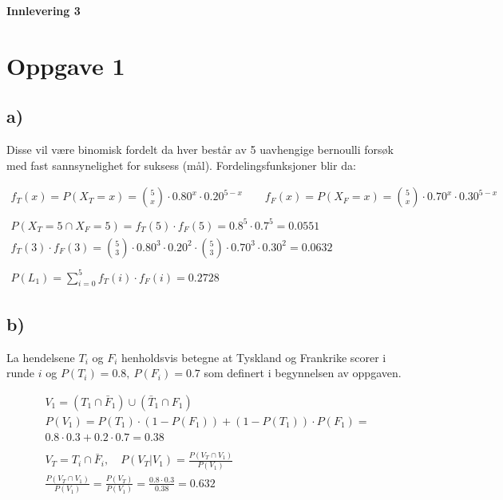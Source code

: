\begin{center}
	\LARGE{\textbf{Innlevering 3}}
\end{center}


\section*{Oppgave 1}


\subsection*{a)}


Disse vil være binomisk fordelt da hver består av 5 uavhengige bernoulli forsøk med fast sannsynelighet for suksess (mål). Fordelingsfunksjoner blir da:

\begin{gather*}
	f_T(x) = P(X_T = x) = \binom{5}{x} \cdot 0.80^x \cdot 0.20^{5 - x}
	\qquad
	f_F(x) = P(X_F = x) = \binom{5}{x} \cdot 0.70^x \cdot 0.30^{5 - x}
	\\
	\\
	P(X_T = 5 \cap X_F = 5) = f_T(5) \cdot f_F(5) = 0.8^5 \cdot 0.7^5 = 0.0551
	\\
	f_T(3) \cdot f_F(3) = \binom{5}{3} \cdot 0.80^3 \cdot 0.20^{2} \cdot
	\binom{5}{3} \cdot 0.70^3 \cdot 0.30^{2} = 0.0632
	\\
	\\
	P(L_1) = \sum_{i = 0}^5{f_T(i) \cdot f_F(i)} = 0.2728
\end{gather*}


\subsection*{b)}

La hendelsene $T_i$ og $F_i$ henholdsvis betegne at Tyskland og Frankrike scorer i runde $i$ og $P(T_i) = 0.8,\ P(F_i) = 0.7$ som definert i begynnelsen av oppgaven.

\begin{gather*}
	V_1 = (T_1 \cap \bar F_1) \cup (\bar T_1 \cap F_1)
	\\
	P(V_1) = P(T_1) \cdot (1 - P(F_1)) + (1 - P(T_1)) \cdot P(F_1)
	=
	\\
	0.8 \cdot 0.3 + 0.2 \cdot 0.7 = 0.38
	\\
	\\
	V_T = T_i \cap \bar F_i, \quad
	P(V_T | V_1) = \frac{P(V_T \cap V_1)}{P(V_1)}
	\\
	\frac{P(V_T \cap V_1)}{P(V_1)} = \frac{P(V_T)}{P(V_1)} = \frac{0.8 \cdot 0.3}{0.38} = 0.632
\end{gather*}


